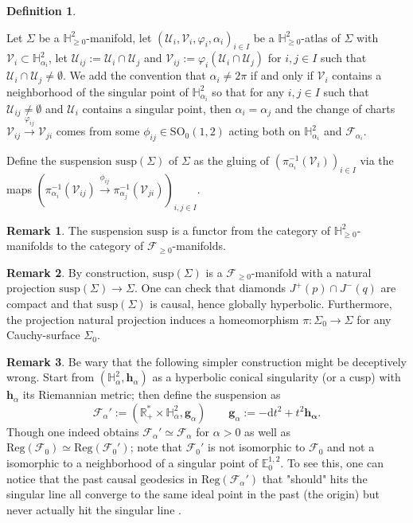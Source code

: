\documentclass[a4paper,12pt]{article}
\def\H{\mathbb{H}}
\def\U{\mathcal U}
\def\GGL{\SO_0(1,2)}
\def\V{\mathcal V}
\def\SO{\mathrm{SO}}
\def\RR{\mathbb{R}}
\newcommand{\mass}[1]{{\mathbb E}^{1,2}_{#1}}
\def\Reg{\mathrm{Reg}}
\def\susp{\mathrm{susp}}
\def\reg{\Reg}
\def\V{\mathcal V}
\def\SO{\mathrm{SO}}
\def\Future{\mathcal F}
\def\reg{\mathrm{Reg}}
\def\U{\mathcal{U}}
\def\Reg{\mathrm{Reg}}
\def\susp{\mathrm{susp}}
\theoremstyle{definition}
\newtheorem{defi}[lem]{Definition}	%
\newtheorem*{rem}{Remark}			 %
\begin{document}
		\begin{defi}  \label{defi:Hsusp}
		
		Let $\Sigma$ be a $\H^2_{\geq0}$-manifold, let $(\U_i,\V_i,\varphi_i,\alpha_i)_{i\in I}$ be a $\H^2_{\geq0}$-atlas of $\Sigma$ with $\V_i\subset \H^2_{\alpha_i}$, let $\U_{ij}:=\U_i\cap \U_j$ and $\V_{ij}:=\varphi_i(\U_i\cap \U_j)$ for $i,j\in I$ such that $\U_i\cap \U_j\neq \emptyset$. We add the convention that $\alpha_i\neq 2\pi$ if and only if $\V_i$ contains a neighborhood of the singular point of $\H^2_{\alpha_i}$ so that for any $i,j\in I$ such that $\U_{ij}\neq \emptyset$ and $\U_i$ contains a singular point, then $\alpha_i=\alpha_j$ and the change of charts $\V_{ij}\xrightarrow{\varphi_{ij}} \V_{ji}$ comes from some $\phi_{ij}\in \GGL$ acting both on $\H^2_{\alpha_i}$ and $\Future_{\alpha_i}$.
		
		 Define the suspension $\susp(\Sigma)$ of $\Sigma$ as the gluing of $\left(\pi_{\alpha_i}^{-1}(\V_i)\right)_{i\in I}$ via the maps $\left(\pi_{\alpha_i}^{-1}(\V_{ij}) \xrightarrow{\phi_{ij}} \pi_{\alpha_j}^{-1}(\V_{ji})\right)_{i,j\in I}$.
		\end{defi}
		\begin{rem}\label{rem:suspension_functor_category_manifolds} The suspension $\susp$ is a functor from the category of $\H^2_{\geq0}$-manifolds to the category of $\Future_{\geq0}$-manifolds.
		 
		\end{rem}

		
		\begin{rem}\label{rem:construction_manifold_natural_projection} By construction, $\susp(\Sigma)$ is a $\Future_{\geq0}$-manifold with a natural projection $\susp(\Sigma) \rightarrow \Sigma$. One can check that diamonds $J^+(p)\cap J^-(q)$ are compact and that $\susp(\Sigma)$ is causal, hence globally hyperbolic. Furthermore, the projection natural projection induces a homeomorphism $\pi: \Sigma_0 \rightarrow \Sigma$ for any Cauchy-surface $\Sigma_0$.
		
		 
		\end{rem}
		\begin{rem}\label{rem:wary_following_simpler_construction} Be wary that the following simpler construction might be deceptively wrong. Start from $(\H^2_\alpha,\mathbf h_\alpha)$ as a hyperbolic conical singularity (or a cusp) with $\mathbf h_\alpha$ its Riemannian metric; then define the suspension as 
		$$ \Future_\alpha':= (\RR_+^*\times \H^2_\alpha,\mathbf{g}_\alpha) \quad \quad \mathbf{g}_\alpha:= -\mathrm d t^2 + t^2 \mathbf{h_\alpha}.$$
		Though one indeed obtains $\Future_\alpha'\simeq \Future_\alpha$ for $\alpha>0$ as well as $\reg(\Future_0)\simeq \reg(\Future_0')$; note that $\Future_0'$ is not isomorphic to $\Future_0$ and not a isomorphic to a neighborhood of a singular point of $\mass{0}$. 
		To see this, one can notice that the past causal geodesics in $\reg(\Future_\alpha')$ that "should" hits the singular line all converge to the same ideal point in the past (the origin) but never actually hit the singular line .
		 
		\end{rem}
\end{document}
